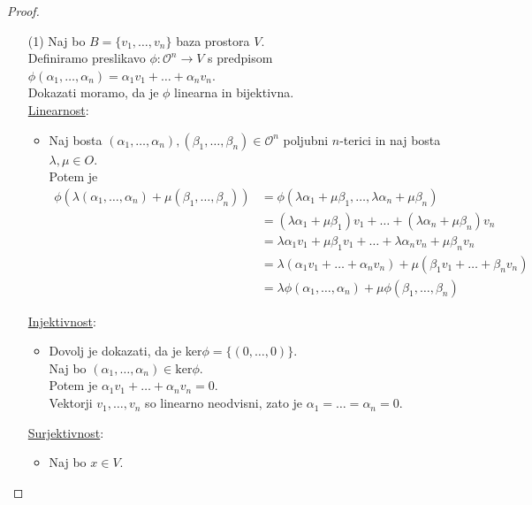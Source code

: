 \documentclass[a4paper,12pt]{article}
\newcommand{\OO}{\mathcal{O}}
\begin{document}
\begin{proof}~

\begin{enumerate}
\item[(1)] Naj bo $B=\{v_1,\ldots,v_n\}$ baza prostora $V$.\\

Definiramo preslikavo $\phi:\OO^n\to V$ s predpisom $\phi(\alpha_1,\ldots,\alpha_n)=\alpha_1v_1+\ldots+\alpha_nv_n$. \\

Dokazati moramo, da je $\phi$ linearna in bijektivna. \\

\underline{Linearnost}:
\begin{itemize}
\item Naj bosta $(\alpha_1,\ldots,\alpha_n),(\beta_1,\ldots,\beta_n)\in \OO^n$ poljubni $n$-terici in naj bosta $\lambda,\mu\in O$. \\

Potem je
\begin{align*}
\phi(\lambda(\alpha_1,\ldots,\alpha_n)+\mu(\beta_1,\ldots,\beta_n)) & = \phi(\lambda \alpha_1+\mu \beta_1,\ldots,\lambda \alpha_n+\mu \beta_n) \\
& = (\lambda \alpha_1+\mu \beta_1)v_1+\ldots+(\lambda \alpha_n+\mu \beta_n)v_n \\
& = \lambda \alpha_1 v_1+\mu \beta_1v_1+\ldots+\lambda \alpha_n v_n+\mu \beta_n v_n \\
& = \lambda (\alpha_1 v_1+\ldots+\alpha_nv_n)+\mu(\beta_1v_1+\ldots+\beta_nv_n) \\
& = \lambda \phi(\alpha_1,\ldots,\alpha_n)+\mu \phi(\beta_1,\ldots,\beta_n)
\end{align*}
\end{itemize}

\underline{Injektivnost}: 
\begin{itemize}
\item Dovolj je dokazati, da je ker$\phi=\{(0,\ldots,0)\}$. \\

Naj bo $(\alpha_1,\ldots,\alpha_n)\in \text{ker}\phi$. \\

Potem je $\alpha_1v_1+\ldots+\alpha_nv_n=0$. \\

Vektorji $v_1,\ldots,v_n$ so linearno neodvisni, zato je $\alpha_1=\ldots=\alpha_n=0$.
\end{itemize}

\underline{Surjektivnost}:
\begin{itemize}
\item Naj bo $x\in V$. \\


\end{itemize}
\end{enumerate}
\end{proof}
\end{document}
